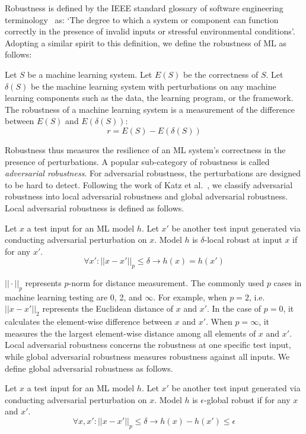 Robustness is defined by the IEEE standard glossary of software engineering terminology~ as:
`The degree to which a system or component can function correctly in the presence of invalid inputs or stressful environmental conditions'.
Adopting a similar spirit to this definition, we define the robustness of ML as follows:
\begin{definition}[Robustness]
Let $S$ be a machine learning system. 
Let $E(S)$ be the correctness of $S$. 
Let $\delta(S)$ be the machine learning system with perturbations on any machine learning components such as the data, the learning program, or the framework.
The robustness of a machine learning system is a measurement of the difference between $E(S)$ and $E(\delta(S))$:
\begin{equation}
r = E(S)-E(\delta(S))
\end{equation}	
\end{definition}
Robustness thus measures the resilience of an ML system's correctness in the presence of perturbations.
A popular sub-category of robustness is called \emph{adversarial robustness}. 
For adversarial robustness, the perturbations are designed to be hard to detect.
Following the work of Katz et al.~, we classify adversarial robustness into local adversarial robustness and global adversarial robustness.
Local adversarial robustness is defined as follows.
\begin{definition}
Let $x$ a test input for an ML model $h$. 
Let $x'$ be another test input generated via conducting adversarial perturbation on $x$.
Model $h$ is $\delta$-local robust at input $x$ if for any $x'$. 
\begin{equation}
 \forall x': ||x-x'||_p \leq \delta \rightarrow h(x)=h(x') 
\end{equation}
\end{definition}
$||\cdot||_p$ represents $p$-norm for distance measurement. The commonly used $p$ cases in machine learning testing are 0, 2, and $\infty$. For example, when $p=2$, i.e.\, $||x-x'||_2$ represents the Euclidean distance of $x$ and $x'$.
In the case of $p=0$, it calculates the element-wise difference between $x$ and $x'$.
When $p=\infty$, it measures the the largest element-wise distance among all elements of $x$ and $x'$.
Local adversarial robustness concerns the robustness at one specific test input, while global adversarial robustness measures robustness against all inputs. 
We define global adversarial robustness as follows.
\begin{definition}
Let $x$ a test input for an ML model $h$. 
Let $x'$ be another test input generated via conducting adversarial perturbation on $x$.
Model $h$ is $\epsilon$-global robust if for any $x$ and $x'$.
\begin{equation}
\forall x, x':  ||x-x'||_p \leq \delta \rightarrow h(x)-h(x') \leq \epsilon
\end{equation}
\end{definition}

